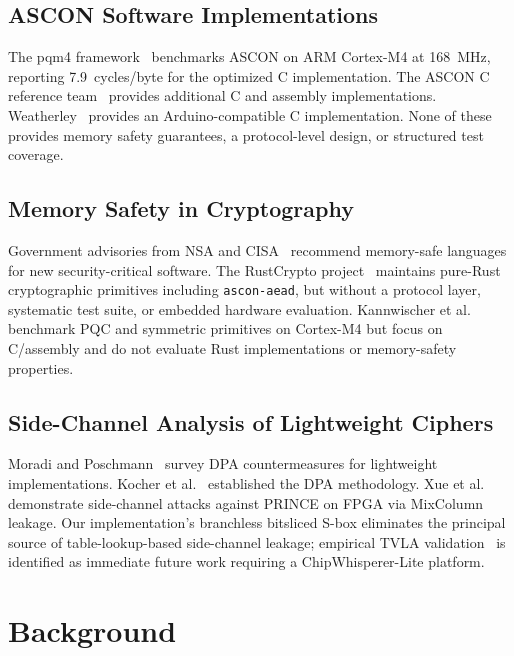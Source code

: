 \documentclass[anonymous]{ndss}
\begin{document}
\subsection{ASCON Software Implementations}

The pqm4 framework~\cite{b10} benchmarks ASCON on ARM Cortex-M4 at
168~MHz, reporting 7.9~cycles/byte for the optimized C implementation.
The ASCON C reference team~\cite{b12} provides additional C and assembly
implementations. Weatherley~\cite{b11} provides an Arduino-compatible
C implementation. None of these provides memory safety guarantees,
a protocol-level design, or structured test coverage.

\subsection{Memory Safety in Cryptography}

Government advisories from NSA and CISA~\cite{b16} recommend
memory-safe languages for new security-critical software. The RustCrypto
project~\cite{b17} maintains pure-Rust cryptographic primitives including
\texttt{ascon-aead}, but without a protocol layer, systematic test suite,
or embedded hardware evaluation. Kannwischer et al.~\cite{b10} benchmark
PQC and symmetric primitives on Cortex-M4 but focus on C/assembly and do
not evaluate Rust implementations or memory-safety properties.

\subsection{Side-Channel Analysis of Lightweight Ciphers}

Moradi and Poschmann~\cite{b13} survey DPA countermeasures for lightweight
implementations. Kocher et al.~\cite{b15} established the DPA methodology.
Xue et al.~\cite{b14} demonstrate side-channel attacks against PRINCE on
FPGA via MixColumn leakage. Our implementation's branchless bitsliced
S-box eliminates the principal source of table-lookup-based side-channel
leakage; empirical TVLA validation~\cite{b19} is identified as immediate
future work requiring a ChipWhisperer-Lite platform.

\section{Background}
\label{sec:background}
\end{document}
